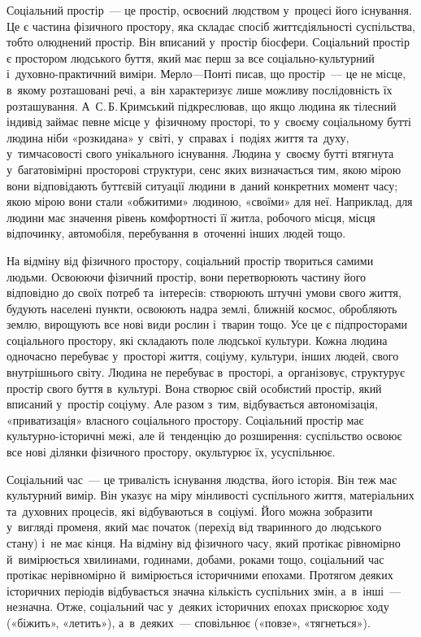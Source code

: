 \documentclass[a5paper,oneside,DIV=12,12pt,headings=small]{scrartcl}
\begin{document}
		Соціальний простір~— це простір, освоєний людством у~процесі його існування. Це є частина фізичного простору, яка складає спосіб життєдіяльності суспільства, тобто олюднений простір. Він вписаний у~простір біосфери. Соціальний простір є простором людського буття, який має перш за все соціально-культурний і~духовно-практичний виміри. Мерло—Понті писав, що простір~— це не місце, в~якому розташовані речі, а~він характеризує лише можливу послідовність їх розташування. А~С.\,Б.\,Кримський підкреслював, що якщо людина як тілесний індивід займає певне місце у~фізичному просторі, то у~своєму соціальному бутті людина ніби «розкидана» у~світі, у~справах і~подіях життя та~духу, у~тимчасовості свого унікального існування. Людина у~своєму бутті втягнута у~багатовімірні просторові структури, сенс яких визначається тим, якою мірою вони відповідають буттєвій ситуації людини в~даний конкретних момент часу; якою мірою вони стали «обжитими» людиною, «своїми» для неї. Наприклад, для людини має значення рівень комфортності її житла, робочого місця, місця відпочинку, автомобіля, перебування в~оточенні інших людей тощо.

		На відміну від фізичного простору, соціальний простір твориться самими людьми. Освоюючи фізичний простір, вони перетворюють частину його відповідно до своїх потреб та~інтересів: створюють штучні умови свого життя, будують населені пункти, освоюють надра землі, ближній космос, обробляють землю, вирощують все нові види рослин і~тварин тощо. Усе це є підпросторами соціального простору, які складають поле людської культури. Кожна людина одночасно перебуває у~просторі життя, соціуму, культури, інших людей, свого внутрішнього світу. Людина не перебуває в~просторі, а~організовує, структурує простір свого буття в~культурі. Вона створює свій особистий простір, який вписаний у~простір соціуму. Але разом з~тим, відбувається автономізація, «приватизація» власного соціального простору. Соціальний простір має культурно-історичні межі, але й~тенденцію до розширення: суспільство освоює все нові ділянки фізичного простору, окультурює їх, усуспільнює.

		Соціальний час~— це тривалість існування людства, його історія. Він теж має культурний вимір. Він указує на міру мінливості суспільного життя, матеріальних та~духовних процесів, які відбуваються в~соціумі. Його можна зобразити у~вигляді променя, який має початок (перехід від тваринного до людського стану) і~не має кінця. На відміну від фізичного часу, який протікає рівномірно й~вимірюється хвилинами, годинами, добами, роками тощо, соціальний час протікає нерівномірно й~вимірюється історичними епохами. Протягом деяких історичних періодів відбувається значна кількість суспільних змін, а~в~інші~— незначна. Отже, соціальний час у~деяких історичних епохах прискорює ходу («біжить», «летить»), а~в~деяких~— сповільнює («повзе», «тягнеться»).
\end{document}
